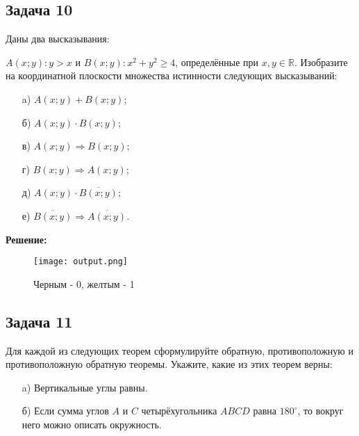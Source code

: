 \documentclass[a4paper,12pt]{article}
\begin{document}
\subsection{Задача 10}
Даны два высказывания:

\(A(x; y) : y > x\) и \(B(x; y) : x^2 + y^2 \geq 4\), определённые при \(x, y \in \mathbb{R}\). Изобразите на координатной плоскости множества истинности следующих высказываний:
\begin{itemize}
    \item[a)] \(A(x; y) + B(x; y)\);
    \item[б)] \(A(x; y) \cdot B(x; y)\);
    \item[в)] \(A(x; y) \Rightarrow B(x; y)\);
    \item[г)] \(B(x; y) \Rightarrow A(x; y)\);
    \item[д)] \(A(x; y) \cdot \overline{B(x; y)}\);
    \item[е)] \(\overline{B(x; y)} \Rightarrow \overline{A(x; y)}\).
\end{itemize}

\textbf{Решение:}
\begin{figure}[H] 
    \centering
    \texttt{[image: output.png]} 
    \caption{Черным - 0, желтым - 1}
    \label{fig:logic_graphs}
\end{figure}
\vspace{1cm}

\subsection{Задача 11}
Для каждой из следующих теорем сформулируйте обратную, противоположную и противоположную обратную теоремы. Укажите, какие из этих теорем верны:
\begin{itemize}
    \item[a)] Вертикальные углы равны.
    \item[б)] Если сумма углов \(A\) и \(C\) четырёхугольника \(ABCD\) равна \(180^\circ\), то вокруг него можно описать окружность.
\end{itemize}
\end{document}
